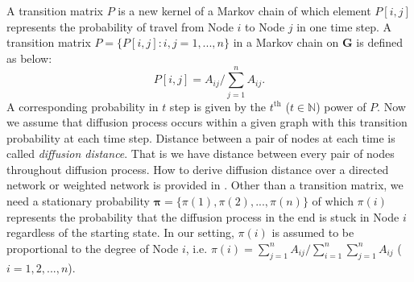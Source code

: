 \documentclass[12pt]{article}
\theoremstyle{definition}
\begin{document}
A transition matrix $P$ is a new kernel of a Markov chain of which element $P[i,j]$ represents the probability of travel from Node $i$ to Node $j$ in one time step. A transition matrix $P = \{P[i,j] : i,j=1,...,n \}$ in a Markov chain on $\boldsymbol{G}$ is defined as below:
\begin{equation}
P[i,j] = A_{ij} \big/ \sum\limits_{j=1}^{n} A_{ij}.
\end{equation}
 A corresponding probability in $t$ step is given by the $t^{\mbox{th}}$ ($t \in \mathbb{N}$) power of $P$. Now we assume that diffusion process occurs within a given graph with this transition probability at each time step. Distance between a pair of nodes at each time is called \textit{diffusion distance}. That is we have distance between every pair of nodes throughout diffusion process. How to derive diffusion distance over a directed network or weighted network is provided in \cite{tang2010graph}. Other than a transition matrix, we need a stationary probability $\boldsymbol{\pi} = \{\pi(1), \pi(2), ... , \pi(n) \}$ of which $\pi(i)$ represents the probability that the diffusion process in the end is stuck in Node $i$ regardless of the starting state. In our setting, $\pi(i)$ is assumed to be proportional to the degree of Node $i$, i.e. $\pi(i) = \sum\limits_{j=1}^{n} A_{ij} \big/ \sum\limits_{i=1}^{n}\sum\limits_{j=1}^{n} A_{ij}$ ($i=1,2,..., n$).   
\end{document}
